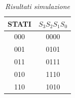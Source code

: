 \begin{table}[!h]\footnotesize
	\centering
	\begin{tabular}{|c|c|}
		\hline
		\textbf{STATI} & \textbf{$S_{3}S_{2}S_{1}S_{0}$}\\
		\hline
		000 & 0000\\
		\hline
		001 &0101 \\
		\hline
		011& 0111\\
		\hline
		010& 1110\\
		\hline
		110& 1010\\
		\hline 
	\end{tabular}
	\caption{\textit{Risultati simulazione}}
	\label{tab2}
\end{table} \\

